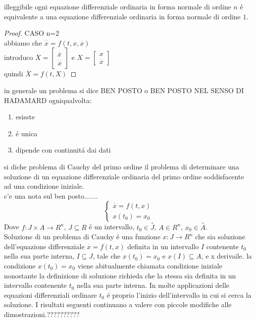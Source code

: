 \observation
illeggibile
\proposition
ogni equazione differenziale ordinaria  in forma normale di ordine $n$ \'e equivalente a una equazione differenziale ordinaria in forma normale di ordine $1$.\\
\begin{proof}
CASO n=2\\
abbiamo che $\overset{\cdot\cdot}{x}=f(t,x,\overset{\cdot}{x})$\\
introduco $\overset{\cdot}{X}=\begin{bmatrix}\overset{\cdot}{x}\\\overset{\cdot\cdot}{x}\end{bmatrix}$ e $X=\begin{bmatrix}x\\\overset{\cdot}{x}\end{bmatrix}$\\
quindi $\overset{\cdot}{X}=f(t,X)$
\end{proof} 
\observation
in generale un problema si dice BEN POSTO o BEN POSTO NEL SENSO DI HADAMARD ogniqualvolta:
\begin{enumerate}
	\item esisste
	\item \'e unica
	\item dipende con continuit\'a dai dati
\end{enumerate} 
si diche problema di Cauchy del primo ordine il problema di determinare una soluzione di un equazione differenziale ordinaria del primo ordine soddisfacente ad una condizione iniziale.\\
c'e una nota sul ben posto.......\\
$$\left\{\begin{matrix}
\overset{\cdot}{x}=f(t,x)\\x(t_0)=x_0
\end{matrix}\right.$$
Dove $f:J\times A\to R^n$, $J\subseteq R$ \'e un intervallo, $t_0\in\overset{\circ}{J}$, $A\in R^n$, $x_0\in\overset{\circ}{A}$.\\
Soluzione di un problema di Cauchy \'e una funzione $x:J\to R^n$ che sia soluzione dell'equazione differenziale $\overset{\cdot}{x}=f(t,x)$ definita in un intervallo $I$ contenente $t_0$ nella sua parte interna, $I\subseteq J$, tale che $x(t_0)=x_0$ e $x(I)\subseteq A$, e x derivaile.
\observation
la condizione $x(t_0)=x_0$ viene abitualmente chiamata condizione iniziale nonostante la definizione di soluzione richieda che la stessa sia definita in un intervallo contenente $t_0$ nella sua parte interna. In molte applicazioni delle equazioni differenziali ordinare $t_0$ \'e proprio l'inizio dell'intervallo in cui si cerca la soluzione. I risultati seguenti continuano a valere con piccole modifiche alle dimostrazioni.??????????
